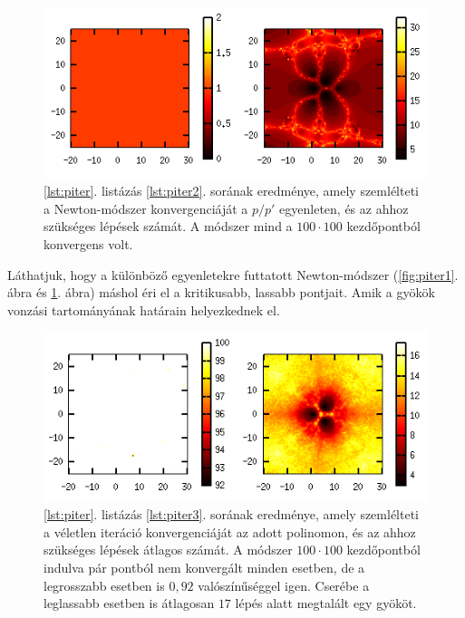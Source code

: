 \documentclass[a4paper,12pt]{report}
\begin{document}
				\begin{figure}[h]
					\centering
					\includegraphics[scale=0.7]{p-iter2.png}
					\caption{\ref{lst:piter}. listázás \ref{lst:piter2}. sorának eredménye, amely szemlélteti a Newton-módszer konvergenciáját a $p/p'$ egyenleten, és az ahhoz szükséges lépések számát. A módszer mind a $100\cdot 100$ kezdőpontból konvergens volt.} \label{fig:piter2}
				\end{figure}
				
				Láthatjuk, hogy a különböző egyenletekre futtatott Newton-módszer (\ref{fig:piter1}. ábra és \ref{fig:piter2}. ábra) máshol éri el a kritikusabb, lassabb pontjait. Amik a gyökök vonzási tartományának határain helyezkednek el.
				
				\begin{figure}[h]
					\centering
					\includegraphics[scale=0.7]{p-iter3.png}
					\caption{\ref{lst:piter}. listázás \ref{lst:piter3}. sorának eredménye, amely szemlélteti a véletlen iteráció konvergenciáját az adott polinomon, és az ahhoz szükséges lépések átlagos számát. A módszer $100\cdot 100$ kezdőpontból indulva pár pontból nem konvergált minden esetben, de a legrosszabb esetben is $0,\!92$ valószínűséggel igen. Cserébe a leglassabb esetben is átlagosan $17$ lépés alatt megtalált egy gyököt.} \label{fig:piter3}
				\end{figure}
				
\end{document}
